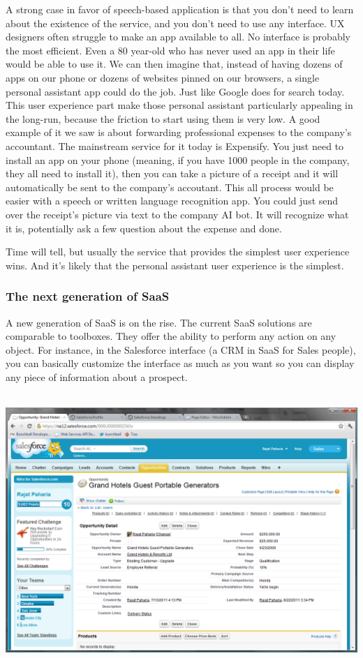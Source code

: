 \documentclass[12pt]{article}
\begin{document}
A strong case in favor of speech-based application is that you don't need to
learn about the existence of the service, and you don't need to use any
interface. UX designers often struggle to make an app available to all. No
interface is probably the most efficient. Even a 80 year-old who has never used
an app in their life would be able to use it. We can then imagine that, instead
of having dozens of apps on our phone or dozens of websites pinned on our
browsers, a single personal assistant app could do the job. Just like Google
does for search today. This user experience part make those personal assistant
particularly appealing in the long-run, because the friction to start using them
is very low. A good example of it we saw is about forwarding professional
expenses to the company's accountant. The mainstream service for it today is
Expensify. You just need to install an app on your phone (meaning, if you have
1000 people in the company, they all need to install it), then you can take a
picture of a receipt and it will automatically be sent to the company's
accoutant. This all process would be easier with a speech or written language
recognition app. You could just send over the receipt's picture via text to the
company AI bot. It will recognize what it is, potentially ask a few question
about the expense and done.

Time will tell, but usually the service that provides the simplest user
experience wins. And it's likely that the personal assistant user experience is
the simplest.


\subsubsection{The next generation of SaaS}

A new generation of SaaS is on the rise. The current SaaS solutions are comparable to toolboxes. They offer the ability to perform any action on any object. For instance, in the Salesforce interface (a CRM in SaaS for Sales people), you can basically customize the interface as much as you want so you can display any piece of information about a prospect.


\\
\includegraphics[width=\textwidth]{salesforce}
\\
\end{document}
